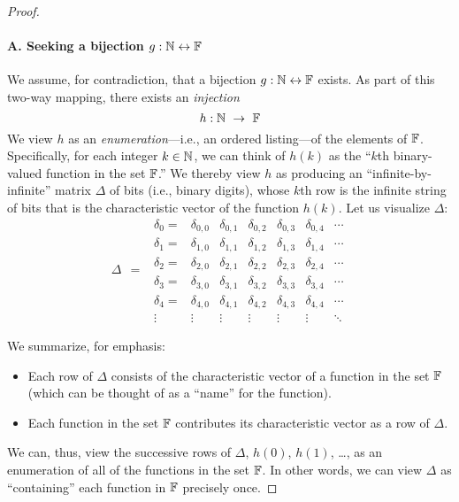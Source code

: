 \begin{proof}
\paragraph{A. Seeking a bijection $g: \mathbb{N} \leftrightarrow \mathbb{F}$}

We assume, for contradiction, that a bijection $g: \mathbb{N} \leftrightarrow
\mathbb{F}$ exists.  As part of this two-way mapping, there exists an {\em
  injection}
\[ 
h: \N \ \rightarrow \ \F
\]
We view $h$ as an {\em enumeration}---i.e., an ordered listing---of
the elements of $\mathbb{F}$.  Specifically, for each integer $k \in \mathbb{N}$, we
can think of $h(k)$ as the ``$k$th binary-valued function in the set
$\mathbb{F}$.''  We thereby view $h$ as producing an ``infinite-by-infinite''
matrix $\Delta$ of bits (i.e., binary digits), whose $k$th row is the
infinite string of bits that is the characteristic vector of the
function $h(k)$.  Let us visualize $\Delta$:
\[ \Delta \ \ = \ \
\begin{array}{ccccccc}
\delta_0 = &
\delta_{0,0} & \delta_{0,1} & \delta_{0,2} & \delta_{0,3} &
	\delta_{0,4} & \cdots \\
\delta_1 = &
\delta_{1,0} & \delta_{1,1} & \delta_{1,2} & \delta_{1,3} &
	\delta_{1,4} & \cdots \\
\delta_2 = &
\delta_{2,0} & \delta_{2,1} & \delta_{2,2} & \delta_{2,3} &
	\delta_{2,4} & \cdots \\
\delta_3 = &
\delta_{3,0} & \delta_{3,1} & \delta_{3,2} & \delta_{3,3} &
	\delta_{3,4} & \cdots \\ 
\delta_4 = &
\delta_{4,0} & \delta_{4,1} & \delta_{4,2} & \delta_{4,3} &
	\delta_{4,4} & \cdots \\ 
\vdots &
\vdots  & \vdots  & \vdots  & \vdots  & \vdots  & \ddots
\end{array}
\]

\noindent We summarize, for emphasis:
\begin{itemize}
\item
Each row of $\Delta$ consists of the characteristic vector of a
function in the set $\mathbb{F}$ (which can be thought of as a ``name'' for
the function).

\item
Each function in the set $\mathbb{F}$ contributes its characteristic vector as
a row of $\Delta$.
\end{itemize}
We can, thus, view the successive rows of $\Delta$, $h(0)$, $h(1)$,
\ldots, as an enumeration of all of the functions in the set $\mathbb{F}$.  In
other words, we can view $\Delta$ as ``containing'' each function in
$\mathbb{F}$ precisely once.


\end{proof}
